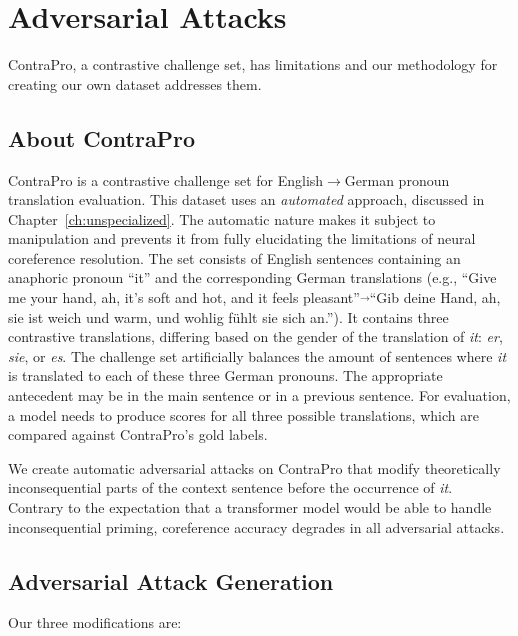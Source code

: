 
\section{Adversarial Attacks}
ContraPro, a contrastive challenge set, has limitations and our methodology for creating our own dataset addresses them.

\subsection{About ContraPro}
\label{sec:contrapro}

ContraPro is a contrastive challenge set  for English$\rightarrow$German pronoun translation evaluation. 
%
This dataset uses an  \textit{automated} approach, discussed in Chapter~\ref{ch:unspecialized}.
%
The automatic nature makes it subject to manipulation and prevents it from fully elucidating the limitations of neural coreference resolution. 
%
The set consists of English sentences containing an anaphoric pronoun ``it'' and the corresponding German translations (e.g., ``Give me your hand, ah, it's soft and hot, and it feels pleasant''$\overrightarrow{}$``Gib deine Hand, ah, sie ist weich und warm, und wohlig fühlt sie sich an.'').
%
It contains three contrastive translations, 
differing based on the gender of the translation of \textit{it}: \textit{er}, \textit{sie}, or \textit{es}.
%
The challenge set artificially balances the  amount of sentences where \textit{it} is translated to each of these three German pronouns.
%
The appropriate antecedent may be in the main sentence or in a previous sentence. 
%
For evaluation, a model needs to produce scores for all three possible translations, 
which are compared against ContraPro's gold labels.


We create automatic adversarial attacks on ContraPro that modify theoretically inconsequential parts of the context sentence before the occurrence of \emph{it}. 
%
Contrary to the expectation that a transformer model would be able to handle inconsequential priming, coreference accuracy degrades in all adversarial attacks.


\subsection{Adversarial Attack Generation}
\label{sec:templates}

Our three modifications are:

